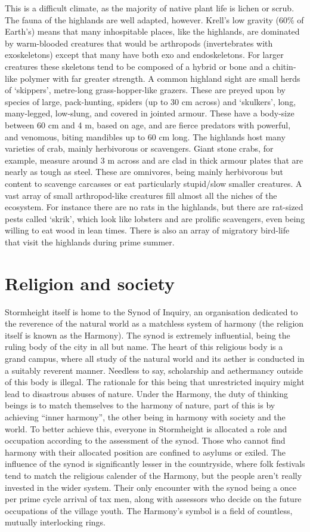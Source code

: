 \documentclass[a4paper,11pt,oneside]{book}
\begin{document}
This is a difficult climate, as the majority of native plant life is lichen or scrub. The fauna of the highlands are well adapted, however. Krell's low gravity (60\% of Earth's) means that many inhospitable places, like the highlands, are dominated by warm-blooded creatures that would be arthropods (invertebrates with exoskeletons) except that many have both exo and endoskeletons. For larger creatures these skeletons tend to be composed of a hybrid or bone and a chitin-like polymer with far greater strength. A common highland sight are small herds of `skippers', metre-long grass-hopper-like grazers. These are preyed upon by species of large, pack-hunting, spiders (up to 30 cm across) and `skulkers', long, many-legged, low-slung, and covered in jointed armour. These have a body-size between 60 cm and 4 m, based on age, and are fierce predators with powerful, and venomous, biting mandibles up to 60 cm long. The highlands host many varieties of crab, mainly herbivorous or scavengers. Giant stone crabs, for example, measure around 3 m across and are clad in thick armour plates that are nearly as tough as steel. These are omnivores, being mainly herbivorous but content to scavenge carcasses or eat particularly stupid/slow smaller creatures. A vast array of small arthropod-like creatures fill almost all the niches of the ecosystem. For instance there are no rats in the highlands, but there are rat-sized pests called `skrik', which look like lobsters and are prolific scavengers, even being willing to eat wood in lean times. There is also an array of migratory bird-life that visit the highlands during prime summer. 

\section{Religion and society}
Stormheight itself is home to the Synod of Inquiry, an organisation dedicated to the reverence of the natural world as a matchless system of harmony (the religion itself is known as the Harmony). The synod is extremely influential, being the ruling body of the city in all but name. The heart of this religious body is a grand campus, where all study of the natural world and its aether is conducted in a suitably reverent manner. Needless to say, scholarship and aethermancy outside of this body is illegal. The rationale for this being that unrestricted inquiry might lead to disastrous abuses of nature. Under the Harmony, the duty of thinking beings is to match themselves to the harmony of nature, part of this is by achieving ``inner harmony'', the other being in harmony with society and the world. To better achieve this, everyone in Stormheight is allocated a role and occupation according to the assessment of the synod. Those who cannot find harmony with their allocated position are confined to asylums or exiled. The influence of the synod is significantly lesser in the countryside, where folk festivals tend to match the religious calender of the Harmony, but the people aren't really invested in the wider system. Their only encounter with the synod being a once per prime cycle arrival of tax men, along with assessors who decide on the future occupations of the village youth. The Harmony's symbol is a field of countless, mutually interlocking rings.
\end{document}
